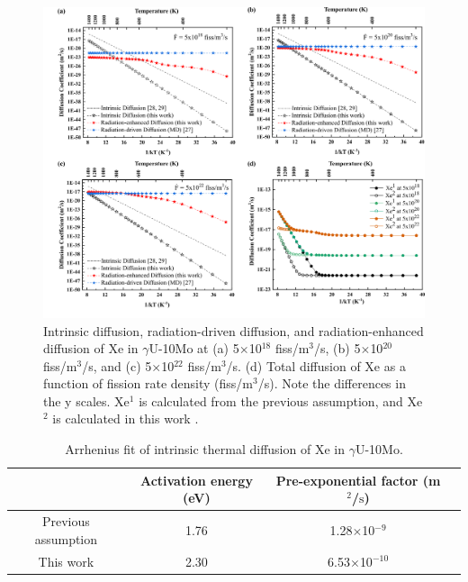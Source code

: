 \documentclass[preprint,12pt]{elsarticle}
\begin{document}
\begin{figure}[hbt!]
\centering
\includegraphics[width=1\textwidth]{Fig10.png}
\caption{Intrinsic diffusion, radiation-driven diffusion, and radiation-enhanced diffusion of Xe in $\gamma$U-10Mo at (a) 5$\times$10$^{18}$ fiss/m$^{3}$/s, (b) 5$\times$10$^{20}$ fiss/m$^{3}$/s, and (c) 5$\times$10$^{22}$ fiss/m$^{3}$/s. (d) Total diffusion of Xe as a function of fission rate density (fiss/m$^{3}$/s). Note the differences in the y scales. Xe$^{1}$ is calculated from the previous assumption, and Xe$^{2}$ is calculated in this work \cite{hu2016microstructural, Beeler2018microstructural}.}
\label{fig:Xered}
\end{figure}


\begin{table}[hbt!]
\captionsetup{font=normalsize} 
\caption{Arrhenius fit of intrinsic thermal diffusion of Xe in $\gamma$U-10Mo.}
\renewcommand{\arraystretch}{1.25}
\begin{center}
\begin{tabular}{cccc}
\hline
 & Activation energy (eV) & Pre-exponential factor (m$^{2}$/$\mathrm{s}$)  \\ 
\hline
Previous assumption \cite{hu2016microstructural, Beeler2018microstructural} & 1.76 & 1.28$\times$10$^{-9}$ \\  
This work & 2.30 & 6.53$\times$10$^{-10}$ \\
\hline
\end{tabular}
\end{center}
\label{tab:diff3} 
\end{table} 
\end{document}
